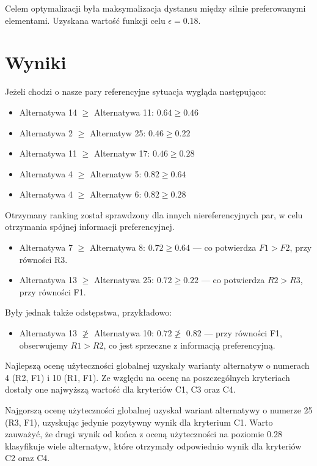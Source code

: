 \documentclass[11pt]{article}
\begin{document}
Celem optymalizacji była maksymalizacja dystansu między silnie preferowanymi elementami. Uzyskana wartość funkcji celu $\epsilon = 0.18$.

\section{Wyniki}\label{sec:wyniki}
Jeżeli chodzi o nasze pary referencyjne sytuacja wygląda następująco:
\begin{itemize}
\item Alternatywa 14 $\geq$ Alternatywa 11: $0.64 \geq 0.46$
\item Alternatywa 2 $\geq$ Alternatyw 25: $0.46 \geq 0.22$
\item Alternatywa 11 $\geq$ Alternatyw 17: $0.46 \geq 0.28$
\item Alternatywa 4 $\geq$ Alternatyw 5: $0.82 \geq 0.64$
\item Alternatywa 4 $\geq$ Alternatyw 6: $0.82 \geq 0.28$
\end{itemize}

Otrzymany ranking został sprawdzony dla innych niereferencyjnych par, w celu otrzymania spójnej informacji preferencyjnej.
\begin{itemize}
\item Alternatywa 7 $\geq$ Alternatywa 8: $0.72 \geq 0.64$ --- co potwierdza $F1 > F2$, przy równości R3.
\item Alternatywa 13 $\geq$ Alternatywa 25: $0.72 \geq 0.22$ --- co potwierdza $R2 > R3$, przy równości F1.
\end{itemize}
Były jednak także odstępstwa, przykładowo:
\begin{itemize}
\item Alternatywa 13 $\not\geq$ Alternatywa 10: $0.72 \not\geq $ 0.82 --- przy równości F1, obserwujemy $R1 > R2$, co jest sprzeczne z informacją preferencyjną.
\end{itemize}

Najlepszą ocenę użyteczności globalnej uzyskały warianty alternatyw o numerach 4 (R2, F1) i 10 (R1, F1). Ze względu na ocenę na poszczególnych kryteriach dostały one najwyższą wartość dla kryteriów C1, C3 oraz C4.

Najgorszą ocenę użyteczności globalnej uzyskał wariant alternatywy o numerze 25 (R3, F1), uzyskując jedynie pozytywny wynik dla kryterium C1. Warto zauważyć, że drugi wynik od końca z oceną użyteczności na poziomie 0.28 klasyfikuje wiele alternatyw, które otrzymały odpowiednio wynik dla kryteriów C2 oraz C4.
\end{document}
